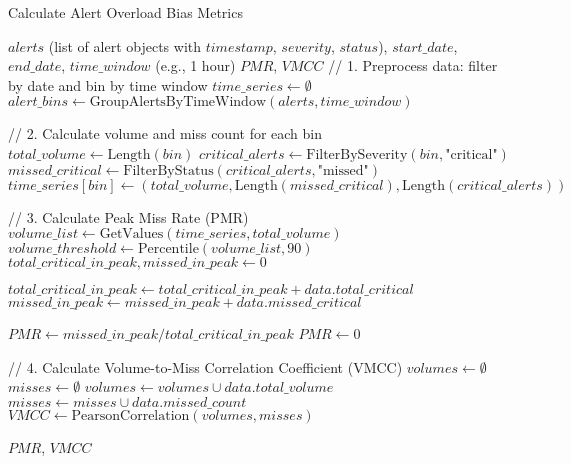 \documentclass[11pt, a4paper]{article}
\begin{document}
\begin{algorithm}[H]
\caption{Calculate Alert Overload Bias Metrics}
\begin{algorithmic}[1]
\Require $alerts$ (list of alert objects with $timestamp$, $severity$, $status$), $start\_date$, $end\_date$, $time\_window$ (e.g., 1 hour)
\Ensure $PMR$, $VMCC$
\State // 1. Preprocess data: filter by date and bin by time window
\State $time\_series \gets \emptyset$
\State $alert\_bins \gets \text{GroupAlertsByTimeWindow}(alerts, time\_window)$

\State // 2. Calculate volume and miss count for each bin
    \State $total\_volume \gets \text{Length}(bin)$
    \State $critical\_alerts \gets \text{FilterBySeverity}(bin, \text{"critical"})$
    \State $missed\_critical \gets \text{FilterByStatus}(critical\_alerts, \text{"missed"})$
    \State $time\_series[bin] \gets (total\_volume, \text{Length}(missed\_critical), \text{Length}(critical\_alerts))$
\EndFor

\State // 3. Calculate Peak Miss Rate (PMR)
\State $volume\_list \gets \text{GetValues}(time\_series, total\_volume)$
\State $volume\_threshold \gets \text{Percentile}(volume\_list, 90)$ 
\State $total\_critical\_in\_peak, missed\_in\_peak \gets 0$

        \State $total\_critical\_in\_peak \gets total\_critical\_in\_peak + data.total\_critical$
        \State $missed\_in\_peak \gets missed\_in\_peak + data.missed\_critical$
    \EndIf
\EndFor

    \State $PMR \gets missed\_in\_peak / total\_critical\_in\_peak$
\Else
    \State $PMR \gets 0$
\EndIf

\State // 4. Calculate Volume-to-Miss Correlation Coefficient (VMCC)
\State $volumes \gets \emptyset$
\State $misses \gets \emptyset$
    \State $volumes \gets volumes \cup data.total\_volume$
    \State $misses \gets misses \cup data.missed\_count$ 
\EndFor
\State $VMCC \gets \text{PearsonCorrelation}(volumes, misses)$

\State \Return $PMR$, $VMCC$
\end{algorithmic}
\end{algorithm}
\end{document}
